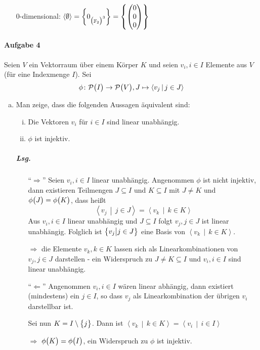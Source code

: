 \documentclass{scrreprt}
\newcommand\hull[1]{\left\langle #1 \right\rangle}
\begin{document}
\begin{enumerate}[(a)]
\begin{itemize}
  \item[$0$-dimensional:]
    $\hull{\emptyset} = \qty{0_{\qty\big(\mathbb{F}_2)^3}}
    = \qty{\begin{pmatrix} 0 \\ 0 \\ 0 \end{pmatrix}}$
  \end{itemize}
\end{enumerate}

\paragraph{Aufgabe 4}
Seien $V$ ein Vektorraum über einem Körper $K$ und seien $v_i, i \in I$ Elemente
aus $V$ (für eine Indexmenge $I$).
Sei
\[
  \phi \colon \mathcal{P}\qty\big(I) \to \mathcal{P}\qty\big(V),
  J \mapsto \hull{v_j \,\middle|\, j \in J}
\]
\begin{enumerate}[(a)]
\item Man zeige, dass die folgenden Aussagen äquivalent sind:
  \begin{enumerate}[(i)]
  \item Die Vektoren $v_i$ für $i \in I$ sind linear unabhängig.
  \item $\phi$ ist injektiv.
  \end{enumerate}

  \subparagraph{Lsg.}
  \begin{itemize}
  \item[``$\Rightarrow$''] Seien $v_i, i \in I$ linear unabhängig.
    Angenommen $\phi$ ist nicht injektiv, dann existieren Teilmengen
    $J \subseteq I$ und $K \subseteq I$ mit $J \ne K$ und
    $\phi\qty\big(J) = \phi\qty\big(K)$, dass heißt
    \[
      \hull{v_j \, \middle| \, j \in J} = \hull{v_k \, \middle| \, k \in K}
    \]
    Aus $v_i, i \in I$ linear unabhängig und $J \subseteq I$ folgt
    $v_j, j \in J$ ist linear unabhängig.
    Folglich ist $\qty\big{v_j {\big |} j \in J}$ eine Basis von
    $\hull{v_k \, \middle| \, k \in K}$.

    $\Rightarrow$ die Elemente $v_k, k \in K$ lassen sich als Linearkombinationen
    von $v_j, j \in J$ darstellen - ein Widerspruch zu $J \ne K \subseteq I$ und
    $v_i, i \in I$ sind linear unabhängig.

  \item[``$\Leftarrow$''] Angenommen $v_i, i \in I$ wären linear abhängig,
    dann existiert (mindestens) ein $j \in I$, so dass $v_j$ als
    Linearkombination der übrigen $v_i$ darstellbar ist.

    Sei nun $K = I \setminus \qty\big{j}$.
    Dann ist
    $\hull{v_k \, \middle | \, k \in K} = \hull{v_i \, \middle | \, i \in I}$

    $\Rightarrow$ $\phi\qty\big(K) = \phi\qty\big(I)$, ein Widerspruch
    zu $\phi$ ist injektiv.
  \end{itemize}
\end{enumerate}
\end{document}
